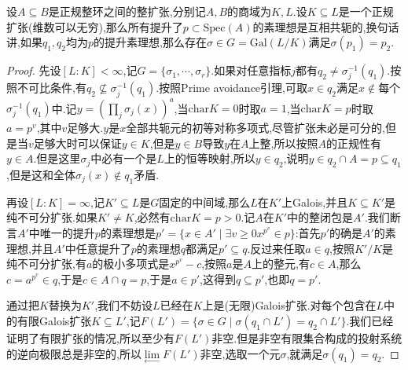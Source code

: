 设$A\subseteq B$是正规整环之间的整扩张,分别记$A,B$的商域为$K,L$.设$K\subseteq L$是一个正规扩张(维数可以无穷),那么所有提升了$p\subset\mathrm{Spec}(A)$的素理想是互相共轭的,换句话讲,如果$q_1,q_2$均为$p$的提升素理想,那么存在$\sigma\in G=\mathrm{Gal}(L/K)$满足$\sigma(p_1)=p_2$.
\begin{proof}
	
	先设$[L:K]<\infty$,记$G=\{\sigma_1,\cdots,\sigma_r\}$.如果对任意指标$j$都有$q_2\not=\sigma_j^{-1}(q_1)$.按照不可比条件,有$q_2\not\subseteq\sigma_j^{-1}(q_1)$.按照Prime avoidance引理,可取$x\in q_2$满足$x\not\in$每个$\sigma_j^{-1}(q_1)$中.记$y=(\prod_j\sigma_j(x))^a$,当$\mathrm{char}K=0$时取$a=1$,当$\mathrm{char}K=p$时取$a=p^v$,其中$v$足够大.$y$是$x$全部共轭元的初等对称多项式,尽管扩张未必是可分的,但是当$v$足够大时可以保证$y\in K$,但是$y\in B$导致$y$在$A$上整,所以按照$A$的正规性有$y\in A$.但是这里$\sigma_j$中必有一个是$L$上的恒等映射,所以$y\in q_2$,说明$y\in q_2\cap A=p\subseteq q_1$,但是这和全体$\sigma_j(x)\not\in q_1$矛盾.
	
	\qquad
	
	再设$[L:K]=\infty$,记$K'\subseteq L$是$G$固定的中间域,那么$L$在$K'$上Galois,并且$K\subseteq K'$是纯不可分扩张.如果$K'\not=K$,必然有$\mathrm{char} K=p>0$.记$A$在$K'$中的整闭包是$A'$.我们断言$A'$中唯一的提升$p$的素理想是$p'=\{x\in A'\mid\exists v\ge0 x^{p^v}\in p\}$:首先$p'$的确是$A'$的素理想,并且$A'$中任意提升了$p$的素理想$q$都满足$p'\subseteq q$.反过来任取$a\in q$,按照$K'/K$是纯不可分扩张,有$a$的极小多项式是$x^{p^v}-c$,按照$a$是$A$上的整元,有$c\in A$,那么$c=a^{p^v}\in q$,于是$c\in A\cap q=p$,于是$a\in p'$,这得到$q\subseteq p'$,也即$q=p'$.
	
	\qquad
	
	通过把$K$替换为$K'$,我们不妨设$L$已经在$K$上是(无限)Galois扩张.对每个包含在$L$中的有限Galois扩张$K\subseteq L'$,记$F(L')=\{\sigma\in G\mid\sigma(q_1\cap L')=q_2\cap L'\}$.我们已经证明了有限扩张的情况,所以至少有$F(L')$非空.但是非空有限集合构成的投射系统的逆向极限总是非空的,所以$\lim\limits_{\leftarrow}F(L')$非空,选取一个元$\sigma$,就满足$\sigma(q_1)=q_2$.
\end{proof}

